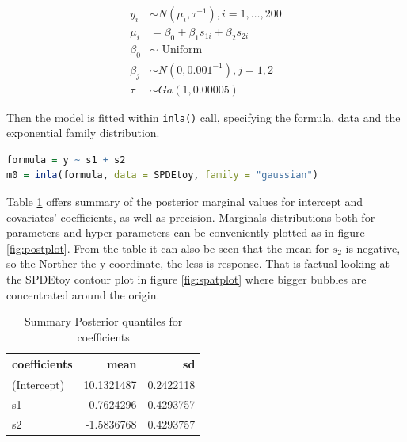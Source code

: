 \documentclass[
  12pt,
  a4paper,
  oneside]{book}
\newcommand{\passthrough}[1]{#1}
\theoremstyle{definition}
\theoremstyle{definition}
\theoremstyle{definition}
\theoremstyle{remark}
\begin{document}
\begin{equation} 
\begin{split}
y_{i} & \sim N\left(\mu_{i}, \tau^{-1}\right), i=1, \ldots, 200 \\
\mu_{i} &=\beta_{0}+\beta_{1} s_{1 i}+\beta_{2} s_{2 i} \\
\beta_{0} & \sim \text { Uniform } \\
\beta_{j} & \sim N\left(0,0.001^{-1}\right), j=1,2 \\
\tau & \sim G a(1,0.00005)
\end{split}
\end{equation}

Then the model is fitted within \passthrough{\lstinline!inla()!} call, specifying the formula, data and the exponential family distribution.

\begin{lstlisting}[language=R]
formula = y ~ s1 + s2
m0 = inla(formula, data = SPDEtoy, family = "gaussian")
\end{lstlisting}

Table \ref{tab:tableINLA} offers summary of the posterior marginal values for intercept and covariates' coefficients, as well as precision. Marginals distributions both for parameters and hyper-parameters can be conveniently plotted as in figure \ref{fig:postplot}. From the table it can also be seen that the mean for \(s_2\) is negative, so the Norther the y-coordinate, the less is response. That is factual looking at the SPDEtoy contour plot in figure \ref{fig:spatplot} where bigger bubbles are concentrated around the origin.

\begin{table}

\caption{\label{tab:tableINLA}Summary Posterior quantiles for coefficients}
\centering
\begin{tabular}[t]{lrr}
\toprule
coefficients & mean & sd\\
\midrule
(Intercept) & 10.1321487 & 0.2422118\\
s1 & 0.7624296 & 0.4293757\\
s2 & -1.5836768 & 0.4293757\\
\bottomrule
\end{tabular}
\end{table}
\end{document}
